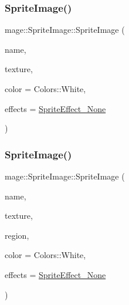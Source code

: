 \hypertarget{classmage_1_1_sprite_image_a0b18feb55a4a9c2c8ac5fad2a3fbf1cb}{}\label{classmage_1_1_sprite_image_a0b18feb55a4a9c2c8ac5fad2a3fbf1cb} 
\subsubsection{\texorpdfstring{Sprite\+Image()}{SpriteImage()}\hspace{0.1cm}{\footnotesize\ttfamily [3/6]}}
{\footnotesize\ttfamily mage\+::\+Sprite\+Image\+::\+Sprite\+Image (\begin{DoxyParamCaption}\item[{const string \&}]{name,  }\item[{\hyperlink{namespacemage_a1e01ae66713838a7a67d30e44c67703e}{Shared\+Ptr}$<$ \hyperlink{classmage_1_1_texture}{Texture} $>$}]{texture,  }\item[{const X\+M\+V\+E\+C\+T\+OR \&}]{color = {\ttfamily Colors\+:\+:White},  }\item[{\hyperlink{namespacemage_a9cfe18123066ba4236f548f9de75d881}{Sprite\+Effect}}]{effects = {\ttfamily \hyperlink{namespacemage_a9cfe18123066ba4236f548f9de75d881af3c275fbfacfe174da928b2f24dfa515}{Sprite\+Effect\+\_\+\+None}} }\end{DoxyParamCaption})\hspace{0.3cm}{\ttfamily [explicit]}}

\hypertarget{classmage_1_1_sprite_image_a189d4bc37642c13805f0efc1423d02c1}{}\label{classmage_1_1_sprite_image_a189d4bc37642c13805f0efc1423d02c1} 
\subsubsection{\texorpdfstring{Sprite\+Image()}{SpriteImage()}\hspace{0.1cm}{\footnotesize\ttfamily [4/6]}}
{\footnotesize\ttfamily mage\+::\+Sprite\+Image\+::\+Sprite\+Image (\begin{DoxyParamCaption}\item[{const string \&}]{name,  }\item[{\hyperlink{namespacemage_a1e01ae66713838a7a67d30e44c67703e}{Shared\+Ptr}$<$ \hyperlink{classmage_1_1_texture}{Texture} $>$}]{texture,  }\item[{const R\+E\+CT \&}]{region,  }\item[{const X\+M\+V\+E\+C\+T\+OR \&}]{color = {\ttfamily Colors\+:\+:White},  }\item[{\hyperlink{namespacemage_a9cfe18123066ba4236f548f9de75d881}{Sprite\+Effect}}]{effects = {\ttfamily \hyperlink{namespacemage_a9cfe18123066ba4236f548f9de75d881af3c275fbfacfe174da928b2f24dfa515}{Sprite\+Effect\+\_\+\+None}} }\end{DoxyParamCaption})\hspace{0.3cm}{\ttfamily [explicit]}}

